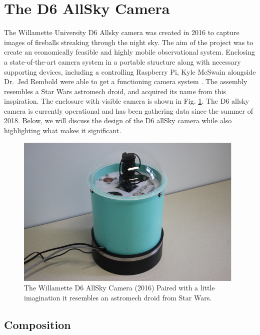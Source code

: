 \section{The D6 AllSky Camera}

The Willamette University D6 Allsky camera was created in 2016 to capture images of fireballs streaking through the night sky. 
The aim of the project was to create an economically feasible and highly mobile observational system.
Enclosing a state-of-the-art camera system in a portable structure along with necessary supporting devices, including a controlling Raspberry Pi, Kyle McSwain alongside Dr.\ Jed Rembold were able to get a functioning camera system \cite{mcswain_using_2016}. 
The assembly resembles a Star Wars astromech droid, and acquired its name from this inspiration.
The enclosure with visible camera is shown in Fig. \ref{droid}.
The D6 allsky camera is currently operational and has been gathering data since the summer of 2018.  
Below, we will discuss the design of the D6 allSky camera while also highlighting what makes it significant.

\begin{figure}[ht!]
  \centering
  \includegraphics[scale=0.7]{images/allsky_camera.png}
  \caption{The Willamette D6 AllSky Camera (2016) Paired with a little imagination it resembles an astromech droid from Star Wars.}
  \label{droid}
\end{figure}

\subsection{Composition}

